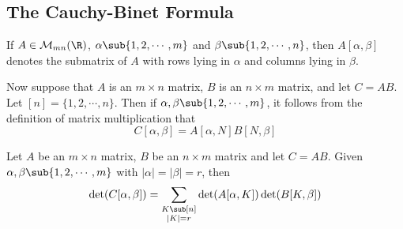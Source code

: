 \subsection{The Cauchy-Binet Formula}
\begin{definition}
If $A\in\mathcal{M}_{mn}(\R)$, $\alpha\sub\{1,2,\cdots,m\}$ and $\beta\sub\{1,2,\cdots,n\}$, then $A[\alpha,\beta]$ denotes the submatrix of $A$ with rows lying in $\alpha$ and columns lying in $\beta$.
\end{definition}
Now suppose that $A$ is an $m\times n$ matrix, $B$ is an $n\times m$ matrix, and let $C=AB$. Let $[n]=\{1,2,\cdots,n\}$. Then if $\alpha,\beta\sub\{1,2,\cdots,m\}$, it follows from the definition of matrix multiplication that
\[C[\alpha,\beta]=A[\alpha,N]B[N,\beta]\]
\begin{theorem}
Let $A$ be an $m\times n$ matrix, $B$ be an $n\times m$ matrix and let $C=AB$. Given $\alpha,\beta\sub\{1,2,\cdots,m\}$ with $|\alpha|=|\beta|=r$, then
\[\det(C[\alpha,\beta])=\sum_{\substack{K\sub [n]\\|K|=r}}\det(A[\alpha,K])\det(B[K,\beta])\]
\end{theorem}
